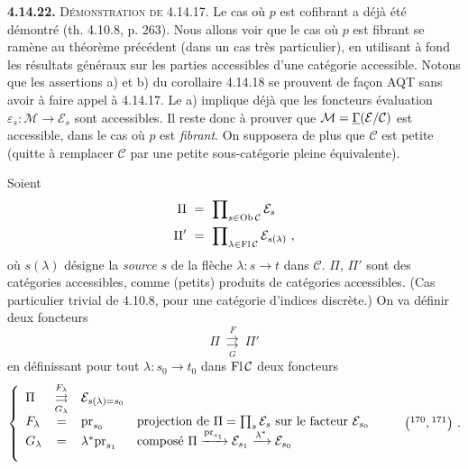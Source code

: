 
\textbf{4.14.22.} \textsc{Démonstration de} 4.14.17. Le cas où $p$ est cofibrant a déjà été démontré (th. 4.10.8, p. 263). Nous allons voir que le cas où $p$ est fibrant se ramène au théorème précédent (dans un cas très particulier), en utilisant à fond les résultats généraux sur les parties accessibles d’une catégorie accessible. Notons que les assertions a) et b) du corollaire 4.14.18 se prouvent de façon AQT sans avoir à faire appel à 4.14.17. Le a) implique déjà que les foncteurs évaluation $\varepsilon_s : \mathcal{M} \longrightarrow \mathcal{E}_s$ sont accessibles. Il reste donc à prouver
que $\mathcal{M} = \underline{\Gamma}(\mathcal{E}/\mathcal{C})$ est accessible, dans le cas où $p$ est \textit{fibrant}. On supposera de plus que $\mathcal{C}$ est petite (quitte à remplacer $\mathcal{C}$ par une petite sous-catégorie pleine équivalente).

Soient
\[
\begin{aligned}
\Pi \ &= \ \prod\nolimits_{s\in\operatorname{Ob}\mathcal{C}} \mathcal{E}_s\\
\Pi' \ &= \ \prod\nolimits_{\lambda\in\operatorname{Fl}\mathcal{C}} \mathcal{E}_{s(\lambda)} \ ,
\end{aligned}
\]
où $s(\lambda)$ désigne la \textit{source} $s$ de la flèche $\lambda : s \longrightarrow t$ dans $\mathcal{C}$. $\Pi$, $\Pi'$ sont des catégories accessibles, comme (petits) produits de catégories accessibles. (Cas particulier trivial de 4.10.8, pour une catégorie d’indices discrète.) On va définir deux foncteurs
\[
\Pi \ \overset{F}{\underset{G}{\rightrightarrows}} \ \Pi'
\]
en définissant pour tout $\lambda : s_0 \longrightarrow t_0$ dans $\operatorname{Fl}\mathcal{C}$ deux foncteurs
\[
\left\{
\begin{array}{lcll}
\Pi & \overset{F_\lambda}{\underset{G_\lambda}{\rightrightarrows}} & \mathcal{E}_{s(\lambda)=s_0} & \\
F_\lambda & = & \pr_{s_0} & \text{projection de } \Pi = \prod\nolimits_s \mathcal{E}_s \text{ sur le facteur } \mathcal{E}_{s_0}\\
G_\lambda & = & \lambda^*\pr_{s_1} & \text{composé } \Pi \xrightarrow{\pr_{s_1}} \mathcal{E}_{s_1} \xrightarrow{\lambda^*} \mathcal{E}_{s_0}\\
 & & &
\end{array}
\right.
\qquad \bigl(\mbox{\footnotemark[170]}, \mbox{\footnotemark[171]}\bigr) \ .
\]

